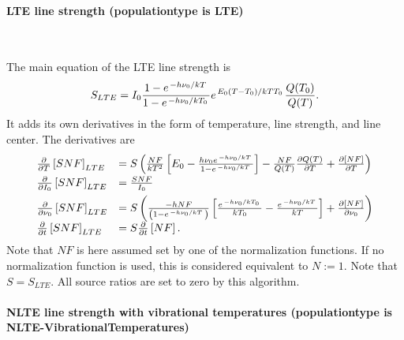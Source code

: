 \paragraph*{LTE line strength (populationtype is LTE)} \

The main equation of the LTE line strength is
\begin{equation}
 S_{LTE} = I_0\frac{1 - e^{\left. -h\nu_0 \middle/ kT\right.}}{1 - e^{\left.
 -h\nu_0 \middle/ kT_0\right.}}e^{\left.{E_0 (T - T_0)}\middle/
 {kTT_0}\right.}\frac{Q(T_0)}{Q(T)}.
\end{equation}
It adds its own derivatives in the form of temperature,
line strength, and line center. The derivatives are
\begin{equation}
\begin{array}{ll}
 \frac{\partial}{\partial T} \left[SNF\right]_{LTE} &= S\left( \frac{NF}{kT^2}\left[{E_0} - 
 \frac{{h\nu_0}e^{\left. -h\nu_0 \middle/ kT\right.}}{
 {1 - e^{\left. -h\nu_0 \middle/ kT\right.}}}\right] - \frac{NF}{Q(T)}\frac{\partial Q(T)}{\partial T} + \frac{\partial\left[NF\right]}{\partial T}  \right) \\[5pt]
 \frac{\partial}{\partial I_0} \left[SNF\right]_{LTE} &= \frac{SNF}{I_0} \\[5pt]
 \frac{\partial}{\partial \nu_0} \left[SNF\right]_{LTE} &= S\left(\frac{-hNF}{\left(1 - e^{\left. -h\nu_0 \middle/ kT\right.}\right)} \left[ \frac{ e^{\left. -h\nu_0 \middle/ kT_0\right.} }{ kT_0 } - \frac{ e^{\left. -h\nu_0 \middle/ kT\right.}}{kT}\right]
 +  \frac{\partial\left[NF\right]}{\partial \nu_0}  \right) \\[5pt]
 \frac{\partial}{\partial t} \left[SNF\right]_{LTE} &= S \frac{\partial}{\partial t} \left[NF\right].
\end{array}
\end{equation}
Note that $NF$ is here assumed set by one of the normalization functions.  If no normalization function is used, this is considered equivalent to $N:=1$. 
Note that $S=S_{LTE}$.  All source ratios are set to zero by this algorithm.

\paragraph*{NLTE line strength with vibrational temperatures (populationtype is NLTE-VibrationalTemperatures)} \


